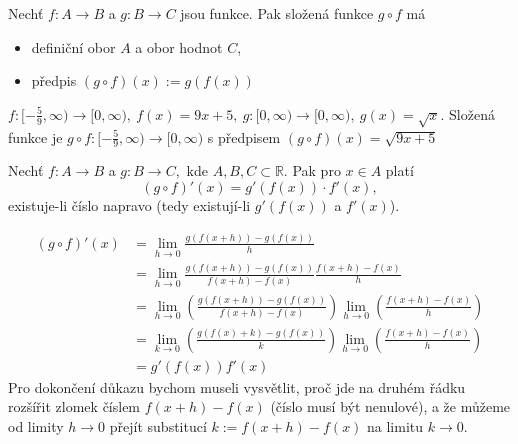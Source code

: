\begin{definice}
  Nechť $f\colon A\to B$ a $g\colon B\to C$ jsou funkce. Pak složená funkce $g\circ f$ má
\begin{itemize}
\item definiční obor $A$ a obor hodnot $C$,
\item předpis $(g\circ f)(x) := g(f(x))$
\end{itemize}

\begingroup
{}
\begin{center}
\end{center}
\endgroup

\end{definice}

\begin{příklad}\label{pr:slozena funkce}
	$f\colon [-\frac{5}{9},\infty)\to [0,\infty),\ f(x)=9x+5,\ g\colon [0,\infty)\to [0,\infty),\ g(x)=\sqrt{x}.$ Složená funkce je $g\circ f\colon [-\frac{5}{9},\infty)\to [0,\infty)$ s předpisem $(g\circ f)(x)=\sqrt{9x+5}$
\end{příklad}

\begin{věta}\label{veta:derivace slozene funkce}
  Nechť $f\colon A\to B$ a $g\colon B\to C,$ kde $A,B,C\subset \mathbb{R}.$ Pak pro $x\in A$ platí
  \begin{equation*}
	  (g\circ f)'(x)=g'(f(x))\cdot f'(x),
  \end{equation*}
  existuje-li číslo napravo (tedy existují-li $g'(f(x))$ a $f'(x)$).
\end{věta}
\begin{náčrt důkazu}
  \begin{align*}
	  (g\circ f)'(x) &= \lim_{h\to 0}\frac{g(f(x+h))-g(f(x))}{h} \\
			 &= \lim_{h\to 0}\frac{g(f(x+h))-g(f(x))}{f(x+h)-f(x)}\frac{f(x+h)-f(x)}{h} \\
			 &= \lim_{h\to 0}\left(\frac{g(f(x+h))-g(f(x))}{f(x+h)-f(x)}\right)\lim_{h\to 0}\left(\frac{f(x+h)-f(x)}{h}\right) \\
			 &= \lim_{k\to 0}\left(\frac{g(f(x)+k)-g(f(x))}{k}\right)\lim_{h\to 0}\left(\frac{f(x+h)-f(x)}{h}\right) \\
			 &= g'(f(x))f'(x)
  \end{align*}
  Pro dokončení důkazu bychom museli vysvětlit, proč jde na druhém řádku rozšířit zlomek číslem $f(x+h)-f(x)$ (číslo musí být nenulové), a že můžeme od limity $h\to 0$ přejít substitucí $k:=f(x+h)-f(x)$ na limitu $k\to 0.$
\end{náčrt důkazu}

